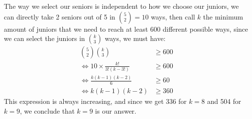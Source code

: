 \documentclass[12pt]{article}
\begin{document}
\begin{spacing}{1.3}
\begin{solution}
   The way we select our seniors is independent to how we choose our juniors, we can directly take 2 seniors out of 5 in $\binom{5}{2}=10$ ways, then call $k$ the minimum amount of juniors that we need to reach at least 600 different possible ways, since we can select the juniors in $\binom{k}{3}$ ways, we must have:
   \begin{align*}
       \binom{5}{2}\binom{k}{3} &\geq 600 \\
       \iff 10 \times \frac{k!}{3!(k-3!)} &\geq 600 \\
       \iff \frac{k(k-1)(k-2)}{6} &\geq 60 \\
       \iff k(k-1)(k-2) &\geq 360
   \end{align*}
   This expression is always increasing, and since we get 336 for $k=8$ and 504 for $k=9$, we conclude that $k=9$ is our answer.
\end{solution}

\end{spacing}
\end{document}
